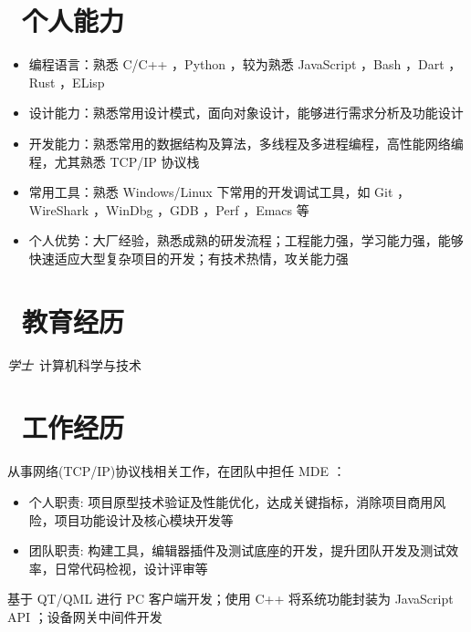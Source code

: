 \documentclass{resume}
\begin{document}



\section{\faCogs\ 个人能力}
\begin{itemize}
  \item 编程语言：熟悉 C/C++ ，Python ，较为熟悉 JavaScript ，Bash ，Dart ，Rust ，ELisp
  \item 设计能力：熟悉常用设计模式，面向对象设计，能够进行需求分析及功能设计
  \item 开发能力：熟悉常用的数据结构及算法，多线程及多进程编程，高性能网络编程，尤其熟悉 TCP/IP 协议栈
  \item 常用工具：熟悉 Windows/Linux 下常用的开发调试工具，如 Git ，WireShark ，WinDbg ，GDB ，Perf ，Emacs 等
  \item 个人优势：大厂经验，熟悉成熟的研发流程；工程能力强，学习能力强，能够快速适应大型复杂项目的开发；有技术热情，攻关能力强
\end{itemize}

\section{\faGraduationCap\ 教育经历}
\textit{学士}\ 计算机科学与技术

\section{\faWrench\ 工作经历}
从事网络(TCP/IP)协议栈相关工作，在团队中担任 MDE ：
\begin{itemize}
  \item 个人职责: 项目原型技术验证及性能优化，达成关键指标，消除项目商用风险，项目功能设计及核心模块开发等
  \item 团队职责: 构建工具，编辑器插件及测试底座的开发，提升团队开发及测试效率，日常代码检视，设计评审等
\end{itemize}


基于 QT/QML 进行 PC 客户端开发；使用 C++ 将系统功能封装为 JavaScript API ；设备网关中间件开发
\end{document}
